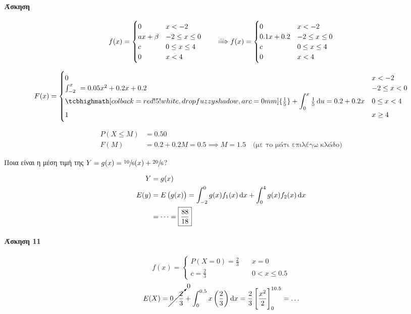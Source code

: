 \documentclass[11pt,a4paper,titlepage,draft]{article}
\newcommand{\attnboxed}[1]{\tcbhighmath[colback=red!5!white,drop fuzzy shadow,arc=0mm]{#1}}
\begin{document}
\paragraph{Άσκηση}

\[
f(x)=\begin{cases}
0&x<-2\\ax+\beta&-2\leq x\leq0\\c&0\leq x\leq4\\0&x<4
\end{cases}
\qquad
\xRightarrow{\dots} 
f(x)=\begin{cases}
0&x<-2\\0.1x+0.2&-2\leq x\leq0\\c&0\leq x\leq4\\0&x<4
\end{cases}
\]

\[
F(x)=\begin{cases}
0&x<-2\\
\int_{-2}^x\ = 0.05x^2+0.2x+0.2&-2\leq x < 0\\
\attnboxed{\frac{1}{5}}+\displaystyle\int_0^x\textstyle \frac{1}{5}\dif u = 0.2+0.2x & 0 \leq x < 4\\
1&x\geq 4
\end{cases}
\]

\begin{attnbox}{}
\begin{align*}
P(X\leq M) &= 0.50\\
F(M) &= 0.2+0.2Μ = 0.5 \implies \boxed{M=1.5} \quad \text{(με το μάτι επιλέγω κλάδο)}
\end{align*}

Ποια είναι η μέση τιμή της \(Y=g(x)=\sfrac{10}{6}(x)+\sfrac{20}{6}\)?

\begin{align*}
Y&=g(x)\\
E(y)&=E\left(g(x)\right)=\int_{-2}^0 g(x)f_1(x)\dif x + \int_0^4 g(x)f_2(x)\dif x
\\
&= \dots = \boxed{\frac{88}{18}}
\end{align*}
\end{attnbox}

\paragraph{Άσκηση 11}
\[
f(x)=\begin{cases}
P(X=0)=\frac{2}{3}\quad&x=0\\
c=\frac{2}{3}& 0 < x \leq 0.5
\end{cases}
\]
\begin{gather*}
E(X)=\cancelto{0}{0\cdot\frac{2}{3}}+\int_0^{0.5}x\left(\frac{2}{3}\right)\dif x = \frac{2}{3}\left[
\frac{x^2}{2}
\right]_0^{10.5}=\dots
\end{gather*}
\end{document}
